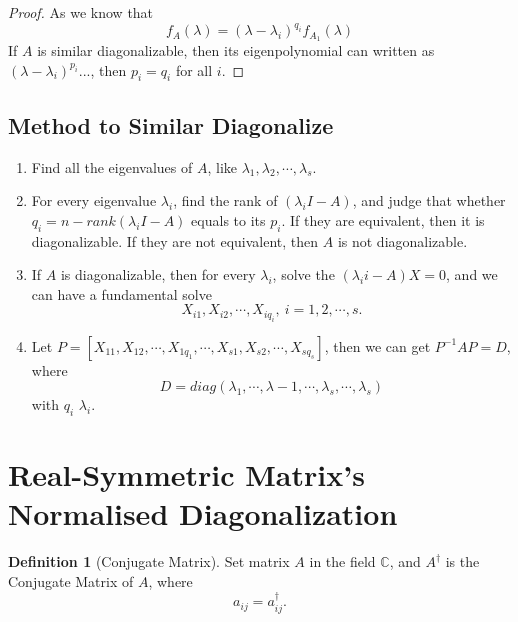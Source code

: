 \documentclass{article}
\theoremstyle{definition}
\newtheorem{defi}{Definition}[section]
\begin{document}
\begin{proof}
    As we know that $$f_{A}(\lambda)=(\lambda-\lambda_{i})^{q_{i}}f_{A_{1}}(\lambda)$$
    If $A$ is similar diagonalizable, then its eigenpolynomial can written as $(\lambda-\lambda_{i})^{p_{i}}...$, then $p_{i}=q_{i}$ for all $i$.
\end{proof}

\subsection{Method to Similar Diagonalize}

\begin{enumerate}
    \item Find all the eigenvalues of $A$, like $\lambda_{1},\lambda_{2},\cdots,\lambda_{s}$.
    \item For every eigenvalue $\lambda_{i}$, find the rank of $(\lambda_{i}I-A)$, and judge that whether $q_{i}=n-rank(\lambda_{i}I-A)$ equals to its $p_{i}$. If they are equivalent, then it is diagonalizable. If they are not equivalent, then $A$ is not diagonalizable.
    \item If $A$ is diagonalizable, then for every $\lambda_{i}$, solve the $(\lambda_{i}i-A)X=0$, and we can have a fundamental solve
$$X_{i1},X_{i2},\cdots,X_{iq_{i}},\ i=1,2,\cdots,s.$$
    \item Let $P=[X_{11},X_{12},\cdots,X_{1q_{1}},\cdots,X_{s1},X_{s2},\cdots,X_{sq_{s}}]$, then we can get $P^{-1}AP=D$, where 
    $$D=diag(\lambda_{1},\cdots,\lambda-{1},\cdots,\lambda_{s},\cdots,\lambda_{s})$$
    with $q_{i}$ $\lambda_{i}$.
\end{enumerate}




















\section{Real-Symmetric Matrix's Normalised Diagonalization}

\begin{defi}[Conjugate Matrix]

    Set matrix $A$ in the field $\mathbb{C}$, and $A^{\dagger}$ is the Conjugate Matrix of $A$,
    where $$a_{ij} = a_{ij}^{\dagger}.$$    
\end{defi}
\end{document}
